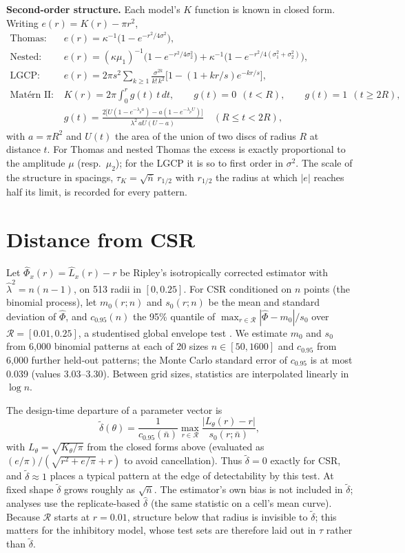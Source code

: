\documentclass[10pt,a4paper]{article}
\newcommand{\nbar}{\bar n}
\newcommand{\dtil}{\tilde\delta}
\newcommand{\R}{\mathcal{R}}
\begin{document}
\textbf{Second-order structure.} Each model's $K$ function is known in closed form. Writing $e(r)=K(r)-\pi r^2$,
\begin{align*}
\text{Thomas:}\quad & e(r)=\kappa^{-1}\big(1-e^{-r^2/4\sigma^2}\big),\\
\text{Nested:}\quad & e(r)=(\kappa\mu_1)^{-1}\big(1-e^{-r^2/4\sigma_2^2}\big)+\kappa^{-1}\big(1-e^{-r^2/4(\sigma_1^2+\sigma_2^2)}\big),\\
\text{LGCP:}\quad & e(r)=2\pi s^2\textstyle\sum_{k\ge1}\frac{\sigma^{2k}}{k!\,k^2}\big[1-(1+kr/s)e^{-kr/s}\big],\\
\text{Mat\'ern II:}\quad & K(r)=2\pi\textstyle\int_0^r g(t)\,t\,dt,\qquad g(t)=0\ \ (t<R),\qquad g(t)=1\ \ (t\ge2R),\\
& g(t)=\frac{2\big[U(1-e^{-\lambda_pa})-a(1-e^{-\lambda_pU})\big]}{\lambda^2\,aU(U-a)}\quad(R\le t<2R),
\end{align*}
with $a=\pi R^2$ and $U(t)$ the area of the union of two discs of radius $R$ at distance $t$. For Thomas and nested Thomas the excess is exactly proportional to the amplitude $\mu$ (resp.\ $\mu_2$); for the LGCP it is so to first order in $\sigma^2$. The scale of the structure in spacings, $\tau_K=\sqrt{\nbar}\,r_{1/2}$ with $r_{1/2}$ the radius at which $|e|$ reaches half its limit, is recorded for every pattern.

\section{Distance from CSR}\label{sec:delta}

Let $\hat\Phi_x(r)=\hat L_x(r)-r$ be Ripley's isotropically corrected estimator \citep{Ripley1977} with $\hat\lambda^2=n(n-1)$, on 513 radii in $[0,0.25]$. For CSR conditioned on $n$ points (the binomial process), let $m_0(r;n)$ and $s_0(r;n)$ be the mean and standard deviation of $\hat\Phi$, and $c_{0.95}(n)$ the 95\% quantile of $\max_{r\in\R}|\hat\Phi-m_0|/s_0$ over $\R=[0.01,0.25]$, a studentised global envelope test \citep{Myllymaki2017}. We estimate $m_0$ and $s_0$ from 6{,}000 binomial patterns at each of 20 sizes $n\in[50,1600]$ and $c_{0.95}$ from 6{,}000 further held-out patterns; the Monte Carlo standard error of $c_{0.95}$ is at most 0.039 (values 3.03--3.30). Between grid sizes, statistics are interpolated linearly in $\log n$.

The design-time departure of a parameter vector is
\[
\dtil(\theta)=\frac{1}{c_{0.95}(\nbar)}\max_{r\in\R}\frac{|L_\theta(r)-r|}{s_0(r;\nbar)},
\]
with $L_\theta=\sqrt{K_\theta/\pi}$ from the closed forms above (evaluated as $(e/\pi)/(\sqrt{r^2+e/\pi}+r)$ to avoid cancellation). Thus $\dtil=0$ exactly for CSR, and $\dtil\approx1$ places a typical pattern at the edge of detectability by this test. At fixed shape $\dtil$ grows roughly as $\sqrt{\nbar}$. The estimator's own bias is not included in $\dtil$; analyses use the replicate-based $\hat\delta$ (the same statistic on a cell's mean curve). Because $\R$ starts at $r=0.01$, structure below that radius is invisible to $\dtil$; this matters for the inhibitory model, whose test sets are therefore laid out in $\tau$ rather than $\dtil$.
\end{document}
